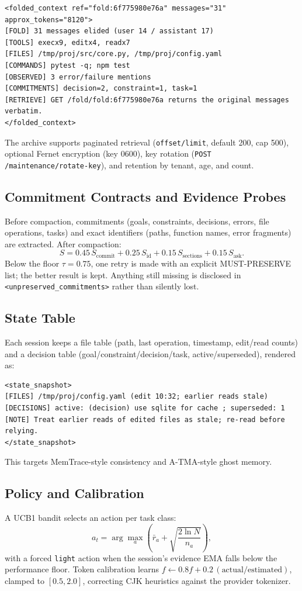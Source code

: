 \documentclass[11pt,a4paper]{article}
\begin{document}
\begin{lstlisting}
<folded_context ref="fold:6f775980e76a" messages="31" approx_tokens="8120">
[FOLD] 31 messages elided (user 14 / assistant 17)
[TOOLS] execx9, editx4, readx7
[FILES] /tmp/proj/src/core.py, /tmp/proj/config.yaml
[COMMANDS] pytest -q; npm test
[OBSERVED] 3 error/failure mentions
[COMMITMENTS] decision=2, constraint=1, task=1
[RETRIEVE] GET /fold/fold:6f775980e76a returns the original messages verbatim.
</folded_context>
\end{lstlisting}

The archive supports paginated retrieval (\texttt{offset/limit}, default 200, cap 500), optional Fernet encryption (key 0600), key rotation (\texttt{POST /maintenance/rotate-key}), and retention by tenant, age, and count.

\subsection{Commitment Contracts and Evidence Probes}
Before compaction, commitments (goals, constraints, decisions, errors, file operations, tasks) and exact identifiers (paths, function names, error fragments) are extracted. After compaction:
\begin{equation}
S = 0.45\,S_{\text{commit}} + 0.25\,S_{\text{id}} + 0.15\,S_{\text{sections}} + 0.15\,S_{\text{ask}} .
\end{equation}
Below the floor $\tau=0.75$, one retry is made with an explicit MUST-PRESERVE list; the better result is kept. Anything still missing is disclosed in \texttt{<unpreserved\_commitments>} rather than silently lost.

\subsection{State Table}
Each session keeps a file table (path, last operation, timestamp, edit/read counts) and a decision table (goal/constraint/decision/task, active/superseded), rendered as:
\begin{lstlisting}
<state_snapshot>
[FILES] /tmp/proj/config.yaml (edit 10:32; earlier reads stale)
[DECISIONS] active: (decision) use sqlite for cache ; superseded: 1
[NOTE] Treat earlier reads of edited files as stale; re-read before relying.
</state_snapshot>
\end{lstlisting}
This targets MemTrace-style consistency and A-TMA-style ghost memory.

\subsection{Policy and Calibration}
A UCB1 bandit selects an action per task class:
\begin{equation}
a_t = \arg\max_a \left( \bar r_a + \sqrt{\frac{2\ln N}{n_a}} \right),
\end{equation}
with a forced \texttt{light} action when the session's evidence EMA falls below the performance floor. Token calibration learns $f \leftarrow 0.8f + 0.2\,(\text{actual}/\text{estimated})$, clamped to $[0.5,2.0]$, correcting CJK heuristics against the provider tokenizer.
\end{document}
